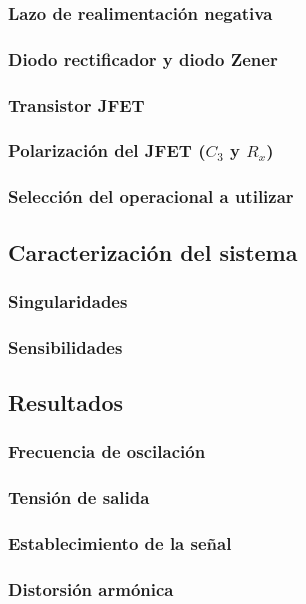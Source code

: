 \subsubsection{Lazo de realimentación negativa}


\subsubsection{Diodo rectificador y diodo Zener}


\subsubsection{Transistor JFET}


\subsubsection{Polarización del JFET ($C_3$ y $R_x$)}


\subsubsection{Selección del operacional a utilizar}



\subsection{Caracterización del sistema}
\subsubsection{Singularidades}


\subsubsection{Sensibilidades}



\subsection{Resultados}
\subsubsection{Frecuencia de oscilación}


\subsubsection{Tensión de salida}


\subsubsection{Establecimiento de la señal}


\subsubsection{Distorsión armónica}

